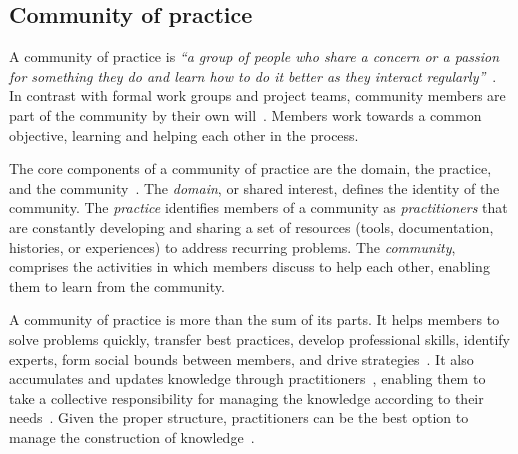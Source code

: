 \documentclass{sig-alternate-05-2015}
\begin{document}

\subsection{Community of practice}
	A community of practice is \textit{``a group of people who share a concern or a passion for something they do and learn how to do it better as they interact regularly''}~\cite{Wenger2000}.
	In contrast with formal work groups and project teams, community members are part of the community by their own will~\cite{Wenger2000}.
	Members work towards a common objective, learning and helping each other in the process.

	The core components of a community of practice are the domain, the practice, and the community~\cite{Wenger2011}.
	The \textit{domain}, or shared interest, defines the identity of the community.
	The \textit{practice} identifies members of a community as \textit{practitioners} that are constantly developing and sharing a set of resources (tools, documentation, histories, or experiences) to address recurring problems. 
	The \textit{community}, comprises the activities in which members discuss to help each other, enabling them to learn from the community.

	A community of practice is more than the sum of its parts.
	It helps members to solve problems quickly, transfer best practices, develop professional skills, identify experts, form social bounds between members, and drive strategies~\cite{Wenger2011, Storey2014}.
	It also accumulates and updates knowledge through practitioners~\cite{Wenger2010}, enabling them to take a collective responsibility for managing the knowledge according to their needs~\cite{Wenger2011}.
	Given the proper structure, practitioners can be the best option to manage the construction of knowledge~\cite{Wenger2011}.

\end{document}
